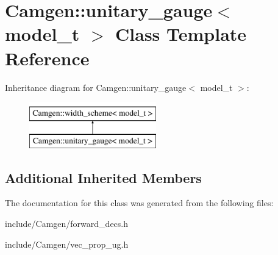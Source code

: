 \hypertarget{a00572}{}\section{Camgen\+:\+:unitary\+\_\+gauge$<$ model\+\_\+t $>$ Class Template Reference}
\label{a00572}
Inheritance diagram for Camgen\+:\+:unitary\+\_\+gauge$<$ model\+\_\+t $>$\+:\begin{figure}[H]
\begin{center}
\leavevmode
\includegraphics[height=2.000000cm]{a00572}
\end{center}
\end{figure}
\subsection*{Additional Inherited Members}


The documentation for this class was generated from the following files\+:\begin{DoxyCompactItemize}
\item 
include/\+Camgen/forward\+\_\+decs.\+h\item 
include/\+Camgen/vec\+\_\+prop\+\_\+ug.\+h\end{DoxyCompactItemize}
